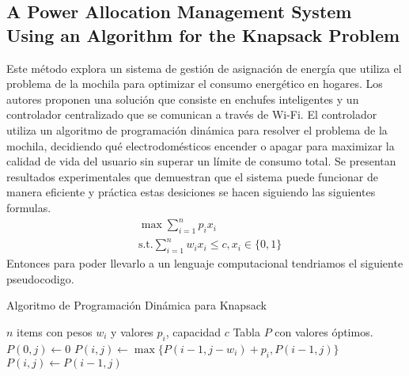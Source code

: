 \documentclass[9pt,a4paper,twoside]{rho-class/rho}
\begin{document}
        \subsection{A Power Allocation Management System Using an Algorithm for the Knapsack Problem}
            Este método explora un sistema de gestión de asignación de energía que utiliza el problema de la mochila para optimizar el consumo energético en hogares. Los autores proponen una solución que consiste en enchufes inteligentes y un controlador centralizado que se comunican a través de Wi-Fi. El controlador utiliza un algoritmo de programación dinámica para resolver el problema de la mochila, decidiendo qué electrodomésticos encender o apagar para maximizar la calidad de vida del usuario sin superar un límite de consumo total. Se presentan resultados experimentales que demuestran que el sistema puede funcionar de manera eficiente y práctica estas desiciones se hacen siguiendo las siguientes formulas.
            \begin{align}
                &\max \sum_{i=1}^{n} p_ix_i \\
                &\text{s.t.} \sum_{i=1}^{n} w_ix_i \leq c, x_i \in \{0,1\}
            \end{align}
            Entonces para poder llevarlo a un lenguaje computacional tendriamos el siguiente pseudocodigo.
            \begin{algorithm}
            \caption{Algoritmo de Programación Dinámica para Knapsack}
            \begin{algorithmic}[1]
            \REQUIRE $n$ items con pesos $w_i$ y valores $p_i$, capacidad $c$
            \ENSURE Tabla $P$ con valores óptimos.
                \STATE $P(0,j) \gets 0$
            \ENDFOR
                        \STATE $P(i,j) \gets \max\{P(i-1,j-w_i) + p_i, P(i-1,j)\}$
                    \ELSE
                        \STATE $P(i,j) \gets P(i-1,j)$
                    \ENDIF
                \ENDFOR
            \ENDFOR
            \end{algorithmic}
            \end{algorithm}
\end{document}
